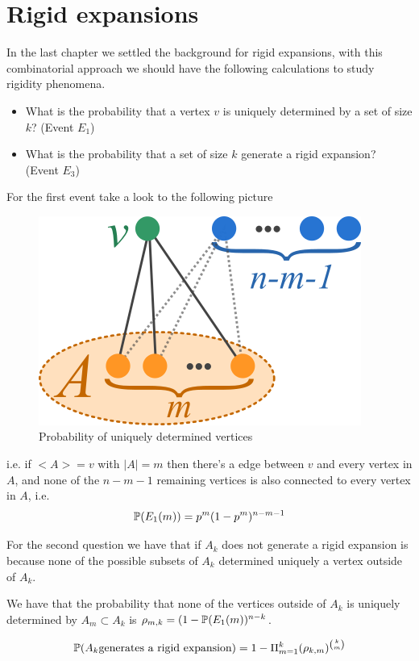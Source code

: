 \section{Rigid expansions}

In the last chapter we settled the background for rigid expansions, with this combinatorial approach we should have the following calculations to study rigidity phenomena.

\begin{itemize}
\item What is the probability that a vertex $v$ is uniquely determined by a set of size $k$? (Event $E_1$)
\item What is the probability that a set of size $k$ generate a rigid expansion? (Event $E_3$)
\end{itemize}

For the first event take a look to the following picture

\begin{figure}[h!]
	\centering
	\includegraphics[scale=0.8]{Figures/uni.png}
	\caption{Probability of uniquely determined vertices}
\end{figure}

i.e. if $<A> = v$ with $|A| = m$ then there's a edge between $v$ and every vertex in $A$, and none of the $n-m-1$ remaining vertices is also connected to every vertex in $A$, i.e.
$$\P(E_1(m)) = p^{m}(1-p^{m})^{n-m-1}$$

For the second question we have that if $A_k$ does not generate a rigid expansion is because none of the possible subsets of $A_k$ determined uniquely a vertex outside of $A_k$. 

We have that the probability that none of the vertices outside of $A_k$ is uniquely determined by $A_m\subset A_k$ is $\rho_{m,k} = (1 -  \P(E_1(m) )^{n-k}$.

$$\P(A_k \text{generates a rigid expansion}) = 1 -  \Pi_{m=1}^{k} (\rho_{k,m})^{\binom{k}{m}}  $$

